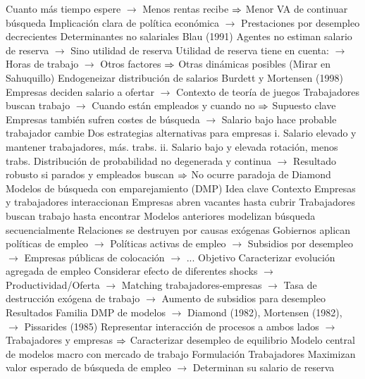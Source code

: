\documentclass{nuevotema}
\begin{document}
\begin{esquemal}
				\4[] Cuanto más tiempo espere
				\4[] $\to$ Menos rentas recibe
				\4[] $\Rightarrow$ Menor VA de continuar búsqueda
				\4[] Implicación clara de política económica
				\4[] $\to$ Prestaciones por desempleo decrecientes
				\4 Determinantes no salariales
				\4[] Blau (1991)
				\4[] Agentes no estiman salario de reserva
				\4[] $\to$ Sino utilidad de reserva
				\4[] Utilidad de reserva tiene en cuenta:
				\4[] $\to$ Horas de trabajo
				\4[] $\to$ Otros factores
				\4[] $\Rightarrow$ Otras dinámicas posibles
				\4[] (Mirar en Sahuquillo)
				\4 Endogeneizar distribución de salarios
				\4[] Burdett y Mortensen (1998)
				\4[] Empresas deciden salario a ofertar
				\4[] $\to$ Contexto de teoría de juegos
				\4[] Trabajadores buscan trabajo
				\4[] $\to$ Cuando están empleados y cuando no
				\4[] $\Rightarrow$ Supuesto clave
				\4[] Empresas también sufren costes de búsqueda
				\4[] $\to$ Salario bajo hace probable trabajador cambie
				\4[] Dos estrategias alternativas para empresas
				\4[] i. Salario elevado y mantener trabajadores, más. trabs.
				\4[] ii. Salario bajo y elevada rotación, menos trabs.
				\4[] Distribución de probabilidad no degenerada y continua
				\4[] $\to$ Resultado robusto si parados y empleados buscan
				\4[] $\Rightarrow$ No ocurre paradoja de Diamond
		\2 Modelos de búsqueda con emparejamiento (DMP)
			\3 Idea clave
				\4 Contexto
				\4[] Empresas y trabajadores interaccionan
				\4[] Empresas abren vacantes hasta cubrir
				\4[] Trabajadores buscan trabajo hasta encontrar
				\4[] Modelos anteriores modelizan búsqueda secuencialmente
				\4[] Relaciones se destruyen por causas exógenas
				\4[] Gobiernos aplican políticas de empleo
				\4[] $\to$ Políticas activas de empleo
				\4[] $\to$ Subsidios por desempleo
				\4[] $\to$ Empresas públicas de colocación
				\4[] $\to$ ...
				\4 Objetivo
				\4[] Caracterizar evolución agregada de empleo
				\4[] Considerar efecto de diferentes shocks
				\4[] $\to$ Productividad/Oferta
				\4[] $\to$ Matching trabajadores-empresas
				\4[] $\to$ Tasa de destrucción exógena de trabajo
				\4[] $\to$ Aumento de subsidios para desempleo
				\4 Resultados
				\4[] Familia DMP de modelos
				\4[] $\to$ Diamond (1982), Mortensen (1982),
				\4[] $\to$ Pissarides (1985)
				\4[] Representar interacción de procesos a ambos lados
				\4[] $\to$ Trabajadores y empresas
				\4[] $\Rightarrow$ Caracterizar desempleo de equilibrio
				\4[] Modelo central de modelos macro con mercado de trabajo
			\3 Formulación
				\4 Trabajadores
				\4[] Maximizan valor esperado de búsqueda de empleo
				\4[] $\to$ Determinan su salario de reserva

\end{esquemal}
\end{document}
